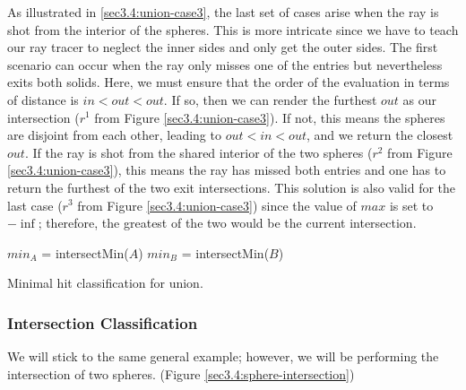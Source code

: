 \documentclass[a4paper,11pt,oneside]{article}
\begin{document}
As illustrated in \ref{sec3.4:union-case3}, the last set of cases arise when the ray is shot from the interior of the spheres. This is more intricate since we have to teach our ray tracer to neglect the inner sides and only get the outer sides. The first scenario can occur when the ray only misses one of the entries but nevertheless exits both solids. Here, we must ensure that the order of the evaluation in terms of distance is $in < out < out$. If so, then we can render the furthest $out$ as our intersection ($r^1$ from Figure \ref{sec3.4:union-case3}). If not, this means the spheres are disjoint from each other, leading to $out < in < out$, and we return the closest $out$. If the ray is shot from the shared interior of the two spheres ($r^2$ from Figure \ref{sec3.4:union-case3}), this means the ray has missed both entries and one has to return the furthest of the two exit intersections. This solution is also valid for the last case ($r^3$ from Figure \ref{sec3.4:union-case3}) since the value of $max$ is set to $-\inf$; therefore, the greatest of the two would be the current intersection.

\begin{algorithm}
	\SetAlgoLined
	$min_A$ = intersectMin($A$)\;
	$min_B$ = intersectMin($B$)\;
	\caption{Minimal hit classification for union.}
	\label{sec3.4:union_algo}
\end{algorithm}

\subsubsection{Intersection Classification}

We will stick to the same general example; however, we will be performing the intersection of two spheres. (Figure \ref{sec3.4:sphere-intersection})
\end{document}
